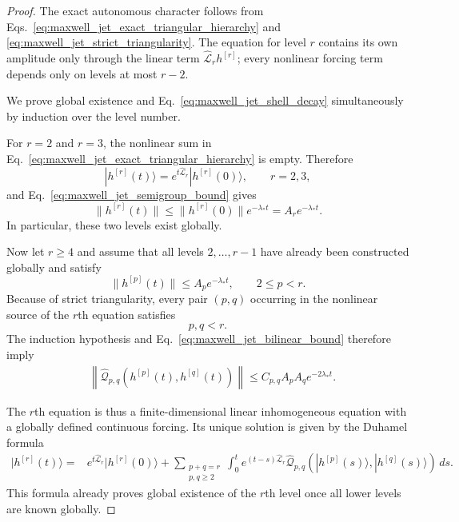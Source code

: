 \documentclass[10pt,a4paper]{amsart}
\begin{document}
\begin{proof}

The exact autonomous character follows from
Eqs.~\eqref{eq:maxwell_jet_exact_triangular_hierarchy} and
\eqref{eq:maxwell_jet_strict_triangularity}.  The equation for level $r$
contains its own amplitude only through the linear term
$\widehat{\mathcal L}_rh^{[r]}$; every nonlinear forcing term depends only
on levels at most $r-2$.

We prove global existence and
Eq.~\eqref{eq:maxwell_jet_shell_decay} simultaneously by induction over
the level number.

For $r=2$ and $r=3$, the nonlinear sum in
Eq.~\eqref{eq:maxwell_jet_exact_triangular_hierarchy} is empty.  Therefore
\begin{equation}
|h^{[r]}(t)\rangle
=
e^{t\widehat{\mathcal L}_r}
|h^{[r]}(0)\rangle,
\qquad r=2,3,
\end{equation}
and Eq.~\eqref{eq:maxwell_jet_semigroup_bound} gives
\begin{equation}
\|h^{[r]}(t)\|
\leq
\|h^{[r]}(0)\|e^{-\lambda_*t}
=
A_re^{-\lambda_*t}.
\end{equation}
In particular, these two levels exist globally.

Now let $r\geq4$ and assume that all levels $2,\ldots,r-1$ have already
been constructed globally and satisfy
\begin{equation}
\|h^{[p]}(t)\|
\leq
A_pe^{-\lambda_*t},
\qquad
2\leq p<r.
\label{eq:maxwell_jet_induction_hypothesis}
\end{equation}
Because of strict triangularity, every pair $(p,q)$ occurring in the
nonlinear source of the $r$th equation satisfies
\begin{equation}
p,q<r.
\end{equation}
The induction hypothesis and
Eq.~\eqref{eq:maxwell_jet_bilinear_bound} therefore imply
\begin{align}
&
\left\|
\widehat{\mathcal Q}_{p,q}
\left(
h^{[p]}(t),h^{[q]}(t)
\right)
\right\|
\leq
C_{p,q}
A_pA_q
e^{-2\lambda_*t}.
\label{eq:maxwell_jet_source_decay}
\end{align}

The $r$th equation is thus a finite-dimensional linear inhomogeneous
equation with a globally defined continuous forcing.  Its unique solution
is given by the Duhamel formula
\begin{equation}
\begin{aligned}
|h^{[r]}(t)\rangle
={}&
e^{t\widehat{\mathcal L}_r}
|h^{[r]}(0)\rangle
+
\sum_{\substack{p+q=r\\p,q\geq2}}
\int_0^t
e^{(t-s)\widehat{\mathcal L}_r}
\widehat{\mathcal Q}_{p,q}
\left(
|h^{[p]}(s)\rangle,
|h^{[q]}(s)\rangle
\right)
\,ds .
\end{aligned}
\label{eq:maxwell_jet_duhamel}
\end{equation}
This formula already proves global existence of the $r$th level once all
lower levels are known globally.


\end{proof}
\end{document}
